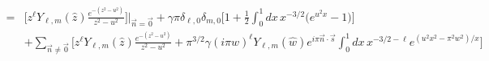 \documentclass[a4paper]{article}
\begin{document}
\begin{align}
 =&
 \Biggr[ z^{\ell} Y_{\ell,m}(\hat{z}) \frac{ e^{ -(z^{2} - u^{2})} }{ z^{2}-u^{2} }
 \Biggr] \Biggr|_{\vec{n}=\vec{0}}
 + \gamma \pi \delta_{\ell,0} \delta_{m,0} \Biggr[ 
 1 + \frac{1}{2} \int_{0}^{1} dx \, x^{-3/2} \big( e^{ u^{2} x } - 1 \big) \Biggr]
 \nonumber\\
 &+ \sum_{\vec{n}\neq\vec{0}}
 \Biggr[ z^{\ell} Y_{\ell,m}(\hat{z}) \frac{ e^{ -(z^{2} - u^{2})} }{ z^{2}-u^{2} }
 + \pi^{3/2} \gamma (i\pi w)^{\ell} Y_{\ell,m}(\hat{w}) e^{i\pi \vec{n}\cdot\vec{s}}
 \int_{0}^{1} dx \, x^{-3/2-\ell} e^{ (u^{2} x^{2} -\pi^{2}w^{2}) /x } \Biggr]
\end{align}
\end{document}
